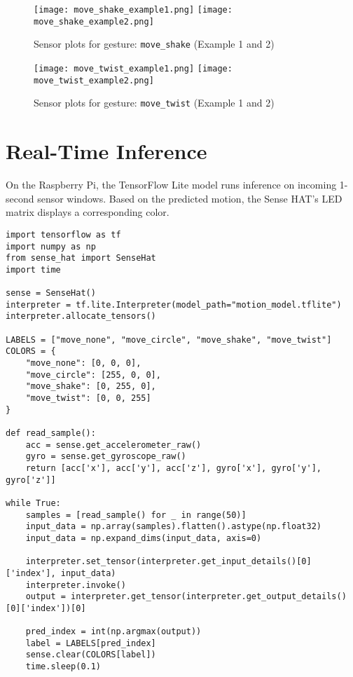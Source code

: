 \documentclass[a4paper,12pt]{article}
\begin{document}
\begin{figure}[H]
\centering
\texttt{[image: move\_shake\_example1.png]}
\hfill
\texttt{[image: move\_shake\_example2.png]}
\caption{Sensor plots for gesture: \texttt{move\_shake} (Example 1 and 2)}
\end{figure}

\begin{figure}[h!]
\centering
\texttt{[image: move\_twist\_example1.png]}
\hfill
\texttt{[image: move\_twist\_example2.png]}
\caption{Sensor plots for gesture: \texttt{move\_twist} (Example 1 and 2)}
\end{figure}

\section{Real-Time Inference}
On the Raspberry Pi, the TensorFlow Lite model runs inference on incoming 1-second sensor windows. Based on the predicted motion, the Sense HAT’s LED matrix displays a corresponding color.

\begin{lstlisting}
import tensorflow as tf
import numpy as np
from sense_hat import SenseHat
import time

sense = SenseHat()
interpreter = tf.lite.Interpreter(model_path="motion_model.tflite")
interpreter.allocate_tensors()

LABELS = ["move_none", "move_circle", "move_shake", "move_twist"]
COLORS = {
    "move_none": [0, 0, 0],
    "move_circle": [255, 0, 0],
    "move_shake": [0, 255, 0],
    "move_twist": [0, 0, 255]
}

def read_sample():
    acc = sense.get_accelerometer_raw()
    gyro = sense.get_gyroscope_raw()
    return [acc['x'], acc['y'], acc['z'], gyro['x'], gyro['y'], gyro['z']]

while True:
    samples = [read_sample() for _ in range(50)]
    input_data = np.array(samples).flatten().astype(np.float32)
    input_data = np.expand_dims(input_data, axis=0)

    interpreter.set_tensor(interpreter.get_input_details()[0]['index'], input_data)
    interpreter.invoke()
    output = interpreter.get_tensor(interpreter.get_output_details()[0]['index'])[0]

    pred_index = int(np.argmax(output))
    label = LABELS[pred_index]
    sense.clear(COLORS[label])
    time.sleep(0.1)
\end{lstlisting}
\end{document}
